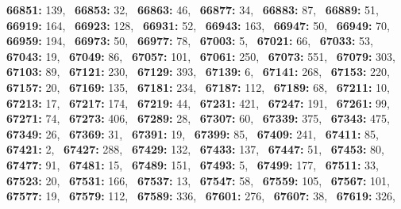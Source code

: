 \textbf{66851:} 139,\allowbreak~ 
\textbf{66853:} 32,\allowbreak~ 
\textbf{66863:} 46,\allowbreak~ 
\textbf{66877:} 34,\allowbreak~ 
\textbf{66883:} 87,\allowbreak~ 
\textbf{66889:} 51,\allowbreak~ 
\textbf{66919:} 164,\allowbreak~ 
\textbf{66923:} 128,\allowbreak~ 
\textbf{66931:} 52,\allowbreak~ 
\textbf{66943:} 163,\allowbreak~ 
\textbf{66947:} 50,\allowbreak~ 
\textbf{66949:} 70,\allowbreak~ 
\textbf{66959:} 194,\allowbreak~ 
\textbf{66973:} 50,\allowbreak~ 
\textbf{66977:} 78,\allowbreak~ 
\textbf{67003:} 5,\allowbreak~ 
\textbf{67021:} 66,\allowbreak~ 
\textbf{67033:} 53,\allowbreak~ 
\textbf{67043:} 19,\allowbreak~ 
\textbf{67049:} 86,\allowbreak~ 
\textbf{67057:} 101,\allowbreak~ 
\textbf{67061:} 250,\allowbreak~ 
\textbf{67073:} 551,\allowbreak~ 
\textbf{67079:} 303,\allowbreak~ 
\textbf{67103:} 89,\allowbreak~ 
\textbf{67121:} 230,\allowbreak~ 
\textbf{67129:} 393,\allowbreak~ 
\textbf{67139:} 6,\allowbreak~ 
\textbf{67141:} 268,\allowbreak~ 
\textbf{67153:} 220,\allowbreak~ 
\textbf{67157:} 20,\allowbreak~ 
\textbf{67169:} 135,\allowbreak~ 
\textbf{67181:} 234,\allowbreak~ 
\textbf{67187:} 112,\allowbreak~ 
\textbf{67189:} 68,\allowbreak~ 
\textbf{67211:} 10,\allowbreak~ 
\textbf{67213:} 17,\allowbreak~ 
\textbf{67217:} 174,\allowbreak~ 
\textbf{67219:} 44,\allowbreak~ 
\textbf{67231:} 421,\allowbreak~ 
\textbf{67247:} 191,\allowbreak~ 
\textbf{67261:} 99,\allowbreak~ 
\textbf{67271:} 74,\allowbreak~ 
\textbf{67273:} 406,\allowbreak~ 
\textbf{67289:} 28,\allowbreak~ 
\textbf{67307:} 60,\allowbreak~ 
\textbf{67339:} 375,\allowbreak~ 
\textbf{67343:} 475,\allowbreak~ 
\textbf{67349:} 26,\allowbreak~ 
\textbf{67369:} 31,\allowbreak~ 
\textbf{67391:} 19,\allowbreak~ 
\textbf{67399:} 85,\allowbreak~ 
\textbf{67409:} 241,\allowbreak~ 
\textbf{67411:} 85,\allowbreak~ 
\textbf{67421:} 2,\allowbreak~ 
\textbf{67427:} 288,\allowbreak~ 
\textbf{67429:} 132,\allowbreak~ 
\textbf{67433:} 137,\allowbreak~ 
\textbf{67447:} 51,\allowbreak~ 
\textbf{67453:} 80,\allowbreak~ 
\textbf{67477:} 91,\allowbreak~ 
\textbf{67481:} 15,\allowbreak~ 
\textbf{67489:} 151,\allowbreak~ 
\textbf{67493:} 5,\allowbreak~ 
\textbf{67499:} 177,\allowbreak~ 
\textbf{67511:} 33,\allowbreak~ 
\textbf{67523:} 20,\allowbreak~ 
\textbf{67531:} 166,\allowbreak~ 
\textbf{67537:} 13,\allowbreak~ 
\textbf{67547:} 58,\allowbreak~ 
\textbf{67559:} 105,\allowbreak~ 
\textbf{67567:} 101,\allowbreak~ 
\textbf{67577:} 19,\allowbreak~ 
\textbf{67579:} 112,\allowbreak~ 
\textbf{67589:} 336,\allowbreak~ 
\textbf{67601:} 276,\allowbreak~ 
\textbf{67607:} 38,\allowbreak~ 
\textbf{67619:} 326,\allowbreak~ 
